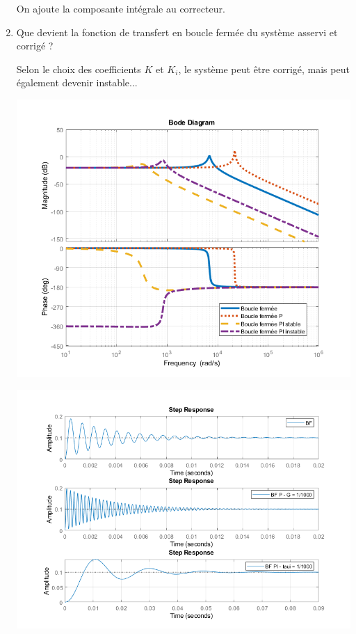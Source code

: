\begin{enumerate}
	\medskip
	
	On ajoute la composante intégrale au correcteur.
	
	\item Que devient la fonction de transfert en boucle fermée du système asservi et corrigé ? 
	
	\medskip	
	
	Selon le choix des coefficients $K$ et $K_i$, le système peut être corrigé, mais peut également devenir instable...
	
	\begin{center}
		\includegraphics[width=14cm]{images/TD/bode_PI_corr.png}
	\end{center}	
	
	\begin{center}
		\includegraphics[width=14cm]{images/TD/step_PI_corr.png}
	\end{center}
	
\end{enumerate}